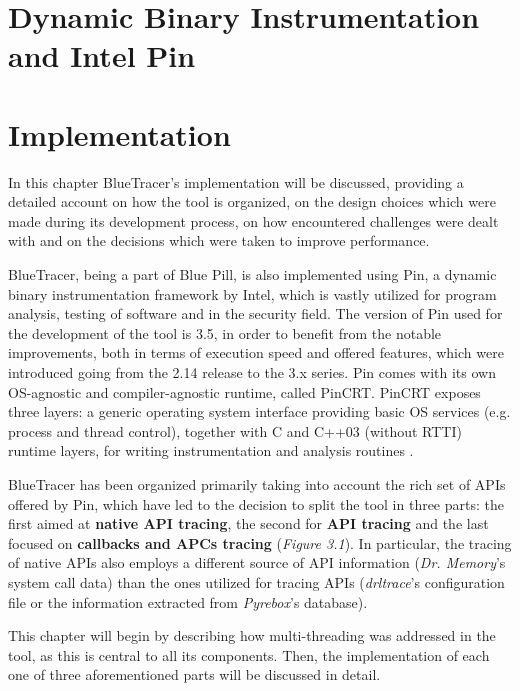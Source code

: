 \documentclass[binding=0.6cm,LaM,english,noexaminfo,oneside]{sapthesis} %
\begin{document}
\cleardoublepage
{} %

\chapter{Dynamic Binary Instrumentation and Intel Pin}

\chapter{Implementation}
In this chapter BlueTracer's implementation will be discussed, providing a detailed account on how the tool is organized, on the design choices which were made during its development process, on how encountered challenges were dealt with and on the decisions which were taken to improve performance.

BlueTracer, being a part of Blue Pill, is also implemented using Pin, a dynamic binary instrumentation framework by Intel, which is vastly utilized for program analysis, testing of software and in the security field. The version of Pin used for the development of the tool is 3.5, in order to benefit from the notable improvements, both in terms of execution speed and offered features, which were introduced going from the 2.14 release to the 3.x series. Pin comes with its own OS-agnostic and compiler-agnostic runtime, called PinCRT. PinCRT exposes three layers: a generic operating system interface providing basic OS services (e.g. process and thread control), together with C and C++03 (without RTTI) runtime layers, for writing instrumentation and analysis routines \cite{Pin}.   

BlueTracer has been organized primarily taking into account the rich set of APIs offered by Pin, which have led to the decision to split the tool in three parts: the first aimed at \textbf{native API tracing}, the second for \textbf{API tracing} and the last focused on \textbf{callbacks and APCs tracing} (\textit{Figure 3.1}). In particular, the tracing of native APIs also employs a different source of API information (\textit{Dr. Memory}'s system call data) than the ones utilized for tracing APIs (\textit{drltrace}'s configuration file or the information extracted from \textit{Pyrebox}'s database).

This chapter will begin by describing how multi-threading was addressed in the tool, as this is central to all its components. Then, the implementation of each one of three aforementioned parts will be discussed in detail. 

\end{document}

